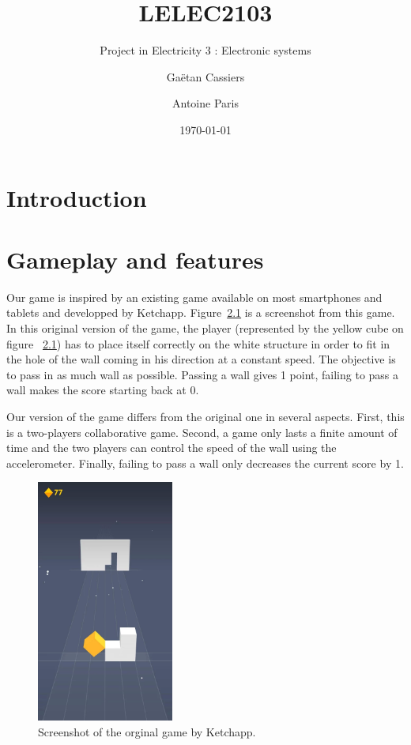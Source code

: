 \documentclass[english, DIV=13]{scrreprt}
\title{LELEC2103}
\subtitle{Project in Electricity 3 : Electronic systems}
\author{Gaëtan Cassiers\and Antoine Paris}
\date{\today}
\begin{document}
\maketitle

\chapter{Introduction}

\chapter{Gameplay and features}
Our game is inspired by an existing game available on most smartphones and tablets
and developped by Ketchapp. Figure~\ref{fig:original-game} is a screenshot from this game.
In this original version of the game, the player (represented by the yellow cube on figure
~\ref{fig:original-game}) has to place itself correctly on the white structure in order
to fit in the hole of the wall coming in his direction at a constant speed. The objective
is to pass in as much wall as possible. Passing a wall gives 1 point, failing to pass a
wall makes the score starting back at 0.

Our version of the game differs from the original one in several aspects. First, this
is a two-players collaborative game. Second, a game only lasts a finite amount of time
and the two players can control the speed of the wall using the accelerometer.
Finally, failing to pass a wall only decreases the current score by 1.

\begin{figure}
    \centering
    \includegraphics[width=0.4\textwidth]{img/original-game}
    \caption{Screenshot of the orginal game by Ketchapp.}
    \label{fig:original-game}
\end{figure}
\end{document}
